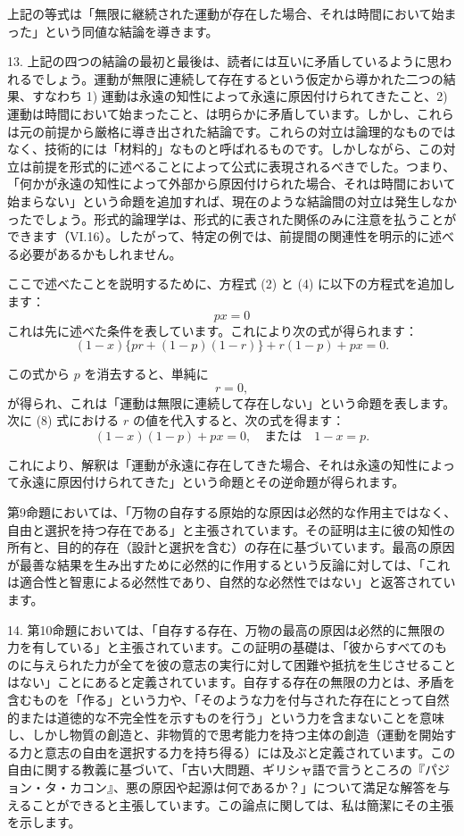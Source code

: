 \documentclass[a4paper,11pt,openany]{ltjsbook}
\begin{document}
上記の等式は「無限に継続された運動が存在した場合、それは時間において始まった」という同値な結論を導きます。

13. 上記の四つの結論の最初と最後は、読者には互いに矛盾しているように思われるでしょう。運動が無限に連続して存在するという仮定から導かれた二つの結果、すなわち 1) 運動は永遠の知性によって永遠に原因付けられてきたこと、2) 運動は時間において始まったこと、は明らかに矛盾しています。しかし、これらは元の前提から厳格に導き出された結論です。これらの対立は論理的なものではなく、技術的には「材料的」なものと呼ばれるものです。しかしながら、この対立は前提を形式的に述べることによって公式に表現されるべきでした。つまり、「何かが永遠の知性によって外部から原因付けられた場合、それは時間において始まらない」という命題を追加すれば、現在のような結論間の対立は発生しなかったでしょう。形式的論理学は、形式的に表された関係のみに注意を払うことができます（VI.16）。したがって、特定の例では、前提間の関連性を明示的に述べる必要があるかもしれません。

ここで述べたことを説明するために、方程式 (2) と (4) に以下の方程式を追加します：
\[
px = 0
\]
これは先に述べた条件を表しています。これにより次の式が得られます：
\[
(1-x) \{ pr + (1-p)(1-r) \} + r(1-p) + px = 0. \tag{8}
\]

この式から $p$ を消去すると、単純に
\[
r = 0,
\]
が得られ、これは「運動は無限に連続して存在しない」という命題を表します。次に (8) 式における $r$ の値を代入すると、次の式を得ます：
\[
(1-x)(1-p) + px = 0, \quad \text{または} \quad 1 - x = p.
\]

これにより、解釈は「運動が永遠に存在してきた場合、それは永遠の知性によって永遠に原因付けられてきた」という命題とその逆命題が得られます。

第9命題においては、「万物の自存する原始的な原因は必然的な作用主ではなく、自由と選択を持つ存在である」と主張されています。その証明は主に彼の知性の所有と、目的的存在（設計と選択を含む）の存在に基づいています。最高の原因が最善な結果を生み出すために必然的に作用するという反論に対しては、「これは適合性と智恵による必然性であり、自然的な必然性ではない」と返答されています。

14. 第10命題においては、「自存する存在、万物の最高の原因は必然的に無限の力を有している」と主張されています。この証明の基礎は、「彼からすべてのものに与えられた力が全てを彼の意志の実行に対して困難や抵抗を生じさせることはない」ことにあると定義されています。自存する存在の無限の力とは、矛盾を含むものを「作る」という力や、「そのような力を付与された存在にとって自然的または道徳的な不完全性を示すものを行う」という力を含まないことを意味し、しかし物質の創造と、非物質的で思考能力を持つ主体の創造（運動を開始する力と意志の自由を選択する力を持ち得る）には及ぶと定義されています。この自由に関する教義に基づいて、「古い大問題、ギリシャ語で言うところの『パジョン・タ・カコン』、悪の原因や起源は何であるか？」について満足な解答を与えることができると主張しています。この論点に関しては、私は簡潔にその主張を示します。
\end{document}
